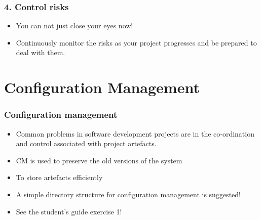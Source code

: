 \begin{frame}[t]\frametitle{4. Control risks}
    \begin{itemize}
    	\item You can not just close your eyes now!
    	\item Continuously monitor the risks as your project progresses and be prepared to deal with them.
    \end{itemize}
\end{frame}


\section{Configuration Management} %
\label{sec:configuration_management}

\begin{frame}[t]\frametitle{Configuration management}
    \begin{itemize}
    	\item Common problems in software development projects are in the co-ordination and control associated with project artefacts.
    	\item CM is used to preserve the old versions of the system
    	\item To store artefacts efficiently
    	\item A simple directory structure for configuration management is suggested!
    	\item See the student's guide exercise 1!
    \end{itemize}
\end{frame}


